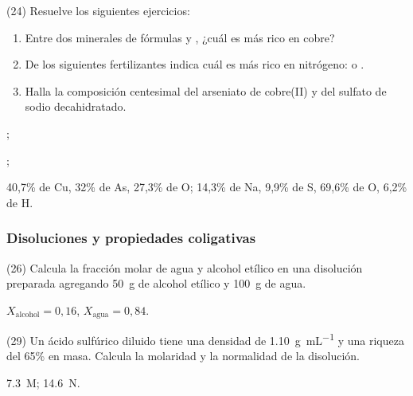 \documentclass[10pt]{article}
\begin{document}
\begin{multicols}{2}
\begin{solution}
\end{solution}

\begin{exercise}
  (24) Resuelve los siguientes ejercicios:
  \begin{enumerate}
    \item Entre dos minerales de fórmulas  y , ¿cuál es más rico en cobre?
    \item De los siguientes fertilizantes indica cuál es más rico en nitrógeno:  o .
    \item Halla la composición centesimal del arseniato de cobre(II)
    y del sulfato de sodio decahidratado.
  \end{enumerate}
\end{exercise}
\begin{solution}
  \begin{enumerate*}
    \item {};
    \item {};
    \item 40,7\% de Cu, 32\% de As, 27,3\% de O; 14,3\% de Na, 9,9\% de S, 69,6\% de O, 6,2\% de H.
  \end{enumerate*}
\end{solution}




\subsubsection{Disoluciones y propiedades coligativas}

\begin{exercise}
  (26) Calcula la fracción molar de agua y alcohol etílico en una
  disolución preparada agregando \SI{50}{\gram} de alcohol etílico y \SI{100}{\gram} de agua.
\end{exercise}
\begin{solution}
  \( X_\textrm{alcohol} = 0,16 \), \( X_\textrm{agua} = 0,84 \).
\end{solution}

\begin{exercise}
  (29) Un ácido sulfúrico diluido tiene una densidad de \SI{1.10}{\gram\per\milli\liter} y una riqueza del 65\% en masa. Calcula la molaridad y la normalidad de la disolución.
\end{exercise}
\begin{solution}
  \SI{7.3}{M}; \SI{14.6}{N}.
\end{solution}


\end{multicols}
\end{document}

